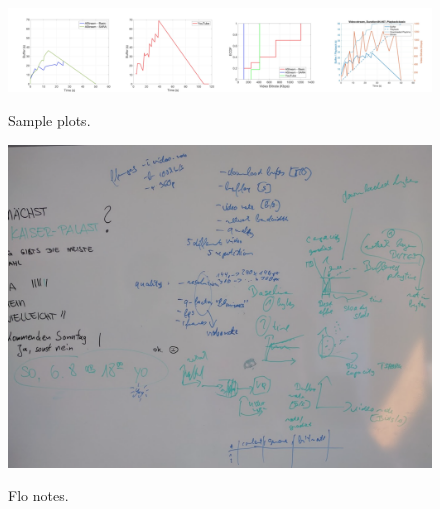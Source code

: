 \begin{figure} [h!]
\caption{Sample plots.}
\includegraphics[width=\textwidth]{graphics/sampleplots}
\label{fig:sampleplots}
\end{figure}

\begin{figure} [h!]
\caption{Flo notes.}
\includegraphics[width=\textwidth]{graphics/flonotes}
\label{fig:flo notes}
\end{figure}
